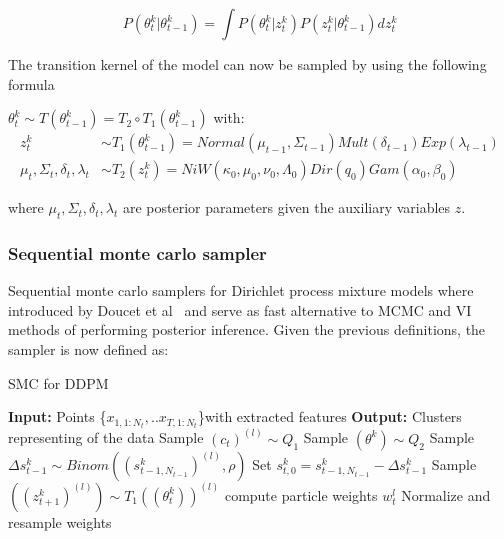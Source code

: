 \documentclass[]{article}
\begin{document}
$$ P(\theta_t^k | \theta_{t-1}^k) =  \int P(\theta_t^k | z_{t}^k)   P(z_t^k| \theta_{t-1}^k) dz_t^k $$

The transition kernel of the model can now be sampled by using the following formula

$\theta_t^k \sim T(\theta_{t-1}^k) = T_2 \circ T_1(\theta_{t-1}^k)$ with:
\begin{equation} \label{eq1}
    \begin{split}
        z_t^k  & \sim T_1(\theta_{t-1}^k)
        = Normal(\mu_{t-1}, \Sigma_{t-1}) Mult( \delta_{t-1}) Exp( \lambda_{t-1})\\
        \mu_t, \Sigma_t, \delta_t,  \lambda_t & \sim T_2(z_t^k)
        = NiW( \kappa_0, \mu_0, \nu_0, \Lambda_0 ) Dir(q_0) Gam(\alpha_0, \beta_0) 
    \end{split}
\end{equation}

where $\mu_t, \Sigma_t, \delta_t,  \lambda_t$  are posterior parameters given the auxiliary variables $z$.

\subsubsection{Sequential monte carlo sampler}

Sequential monte carlo samplers for Dirichlet process mixture models where introduced by Doucet et al~\cite{doucet} and serve as fast alternative to MCMC and VI methods of performing posterior inference. Given the previous definitions, the sampler is now defined as:


\begin{algorithm}[h]
    \caption{SMC for DDPM}\label{SMC}
    \begin{algorithmic}[1]
        \State \textbf{Input:} Points \{$x_{1,1:N_t}, ..x_{T,1:N_t}$\}with extracted features
        \State \textbf{Output:} Clusters representing of the data
        \State Sample $(c_t)^{(l)} \sim Q_1$  
        \State Sample $(\theta^k ) \sim Q_2$
        \EndFor		
        \EndFor
        \State Sample $\Delta s_{t-1}^k \sim Binom( (s_{t-1,N_{t-1}}^k)^{(l)}, \rho) $ 
        \State Set $s_{t,0}^{k} = s_{t-1,N_{t-1}}^{k} -\Delta s_{t-1}^k$
        \State Sample $( (z_{t+1}^k)^{(l)} ) \sim T_1((\theta_t^k))^{(l)} $
        \EndFor
        \State compute particle weights $w_t^l$
        \EndFor
        \State Normalize and resample weights
    \end{algorithmic}
\end{algorithm}
\end{document}
